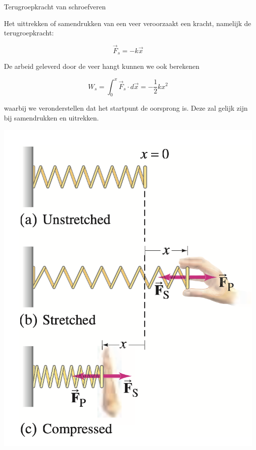 \begin{app}{Terugroepkracht van schroefveren}
    
    \begin{minipage}{.73\textwidth}   
        Het uittrekken of samendrukken van een veer veroorzaakt een kracht, namelijk de terugroepkracht: 
        
        \begin{equation*}
            \Vec{F}_s = -k\Vec{x}
        \end{equation*}
        
        De arbeid geleverd door de veer hangt kunnen we ook berekenen
        
        \begin{equation*}
            W_s = \int_0^x \Vec{F}_s \cdot d\Vec{x} = -\dfrac{1}{2}kx^2
        \end{equation*}

        waarbij we veronderstellen dat het startpunt de oorsprong is. Deze zal gelijk zijn bij samendrukken en uitrekken.


    \end{minipage} 
    \hspace{0.6cm}\begin{minipage}{.25\textwidth}
        \vspace{-0.3cm}
        \includegraphics[scale = 0.285]{Images/Dynamica/Schroefveer.png}
    \end{minipage}
\end{app}

